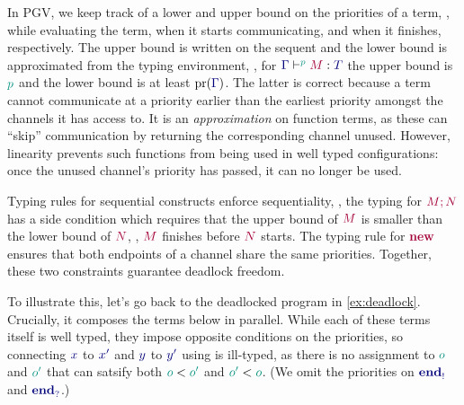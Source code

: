 In PGV, we keep track of a lower and upper bound on the priorities of a term, \ie, while evaluating the term, when it starts communicating, and when it finishes, respectively. The upper bound is written on the sequent and the lower bound is approximated from the typing environment, \eg, for $\tseq[\cs{p}]{\ty{\Gamma}}{M}{T}$ the upper bound is $\cs{p}$ and the lower bound is at least $\minpr(\ty{\Gamma})$. The latter is {correct} because a term cannot communicate at a priority earlier than the earliest priority amongst the channels it has access to. It is an \emph{approximation} on function terms, as these can ``skip'' communication by returning the corresponding channel unused. However, linearity prevents such functions from being used in well typed configurations: once the unused channel's priority has passed, it can no longer be used.

Typing rules for sequential constructs enforce sequentiality, \eg, the typing for $\tm{\andthen{M}{N}}$ has a side condition which requires that the upper bound of $\tm{M}$ is smaller than the lower bound of $\tm{N}$, \ie, $\tm{M}$ finishes before $\tm{N}$ starts. The typing rule for $\tm{\new}$ ensures that both endpoints of a channel share the same priorities. Together, these two constraints guarantee deadlock freedom.

To illustrate this, let's go back to the deadlocked program in \cref{ex:deadlock}. Crucially, it composes the terms below in parallel. While each of these terms itself is well typed, they impose opposite conditions on the priorities, so connecting $\ty{x}$ to $\ty{x'}$ and $\ty{y}$ to $\ty{y'}$ using  is ill-typed, as there is no assignment to $\cs{o}$ and $\cs{o'}$ that can satsify both $\cs{o}<\cs{o'}$ and $\cs{o'}<\cs{o}$. (We omit the priorities on $\ty{\tyends}$ and $\ty{\tyendr}$.)
\begin{mathpar}

\end{mathpar}

